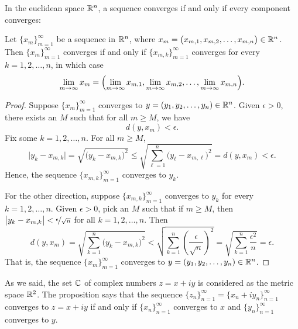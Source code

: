 In the euclidean space ${\mathbb{R}}^n$, a sequence converges if and only if every
component converges:

\begin{prop} \label{prop:msconveuc}
Let $\{ x_m \}_{m=1}^\infty$ be a sequence in ${\mathbb{R}}^n$,
where $x_m = \bigl(x_{m,1},x_{m,2},\ldots,x_{m,n}\bigr) \in {\mathbb{R}}^n$.
Then $\{ x_m \}_{m=1}^\infty$ converges if and only if
$\{ x_{m,k} \}_{m=1}^\infty$ converges for every $k=1,2,\ldots,n$, in which case
\begin{equation*}
\lim_{m\to\infty}
x_m =
\Bigl(
\lim_{m\to\infty} x_{m,1},
\lim_{m\to\infty} x_{m,2},
\ldots,
\lim_{m\to\infty} x_{m,n}
\Bigr) .
\end{equation*}
\end{prop}

\begin{proof}
Suppose
$\{ x_m \}_{m=1}^\infty$ converges to
$y = (y_1,y_2,\ldots,y_n) \in {\mathbb{R}}^n$.
Given $\epsilon > 0$, there exists an $M$ such that for all
$m \geq M$, we have
\begin{equation*}
d(y,x_m) < \epsilon.
\end{equation*}
Fix some $k=1,2,\ldots,n$.  For all $m \geq M$,
\begin{equation*}
\bigl\lvert y_k - x_{m,k} \bigr\rvert
=
\sqrt{{\bigl(y_k - x_{m,k} \bigr)}^2}
\leq
\sqrt{\sum_{\ell=1}^n {\bigl(y_\ell-x_{m,\ell}\bigr)}^2}
= d(y,x_m) < \epsilon .
\end{equation*}
Hence, the sequence $\{ x_{m,k} \}_{m=1}^\infty$ converges to $y_k$.

For the other direction, suppose 
$\{ x_{m,k} \}_{m=1}^\infty$ converges to $y_k$ for every $k=1,2,\ldots,n$.
Given $\epsilon > 0$, pick an $M$ such that if $m \geq M$, then 
$\bigl\lvert y_k-x_{m,k} \bigr\rvert < \nicefrac{\epsilon}{\sqrt{n}}$ for all
$k=1,2,\ldots,n$.  Then
\begin{equation*}
d(y,x_m)
=
\sqrt{\sum_{k=1}^n {\bigl(y_k-x_{m,k}\bigr)}^2}
<
\sqrt{\sum_{k=1}^n {\left(\frac{\epsilon}{\sqrt{n}}\right)}^2}
=
\sqrt{\sum_{k=1}^n \frac{{\epsilon^2}}{n}}
= \epsilon .
\end{equation*}
That is, the sequence $\{ x_m \}_{m=1}^\infty$ converges to
$y = (y_1,y_2,\ldots,y_n) \in {\mathbb{R}}^n$.
\end{proof}

\begin{example}
As we said, the set ${\mathbb{C}}$ of complex numbers $z = x+iy$ is considered 
as the metric space ${\mathbb{R}}^2$.  The proposition says that the
sequence $\{ z_n \}_{n=1}^\infty = \{ x_n + iy_n \}_{n=1}^\infty$ converges
to $z = x+iy$
if and only if $\{ x_n \}_{n=1}^\infty$ converges to $x$ and 
$\{ y_n \}_{n=1}^\infty$ converges to $y$.
\end{example}

